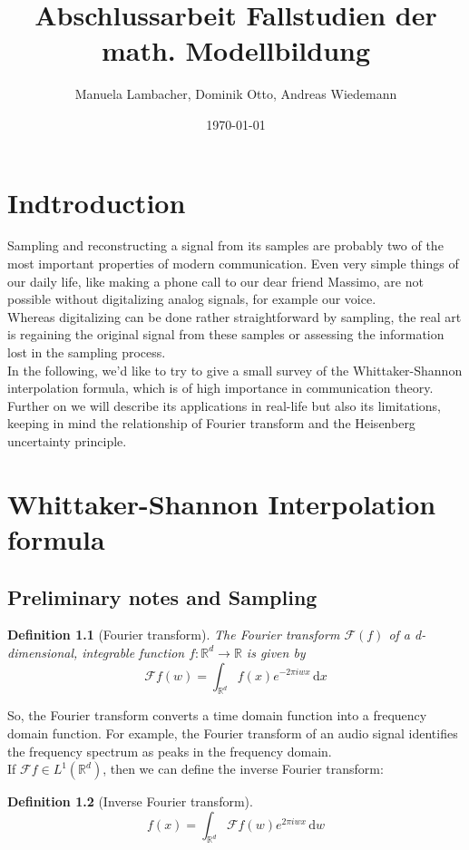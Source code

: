 \documentclass[a4paper, 11pt]{scrreprt}
\title{Abschlussarbeit Fallstudien der math. Modellbildung}
\author{Manuela Lambacher, Dominik Otto, Andreas Wiedemann}
\date{\today}
\newtheorem{defi}{Definition}[section]
\newcommand{\RR}{\mathbb{R}}
\newcommand{\FF}{\mathcal{F}}
\begin{document}
\parindent 0pt
\maketitle
\tableofcontents

\chapter*{Indtroduction}

Sampling and reconstructing a signal from its samples are probably two of the most important properties of modern communication.   Even very simple things of our daily life, like making a phone call to our dear friend Massimo, are not possible without digitalizing analog signals, for example  our voice. \\
Whereas digitalizing can be done rather  straightforward by sampling, the real art is regaining the original signal from these samples or assessing the information lost in the sampling process.\\
In the following, we'd like to try to give a small survey of the Whittaker-Shannon interpolation formula, which is of high importance in communication theory. Further on we will describe its applications in real-life but also its limitations, keeping in mind the relationship of Fourier transform and the Heisenberg uncertainty principle.



\chapter{Whittaker-Shannon Interpolation formula}


\section{Preliminary notes and Sampling}
\begin{defi}[Fourier transform]
The Fourier transform \(\FF(f)\) of a d-dimensional, integrable function \(f:\RR^d \to \RR\) is given by
	\begin{equation}
		\FF f(w)=\int_{\RR^d} f(x)e^{-2\pi iwx}\,\mathrm{d}x
	\end{equation}

\end{defi}
So, the Fourier transform converts a time domain function into a frequency domain function. For example, the Fourier transform of an audio signal identifies the frequency spectrum as peaks in the frequency domain.\\
If \(\FF f\in L^1(\RR^d)\), then we can define the inverse Fourier transform:
\begin{defi}[Inverse Fourier transform]
\begin{equation}
	f(x) = \int_{\RR^d} \FF f(w) e^{2\pi iwx}\,\mathrm{d}w
\end{equation}
\end{defi}
\end{document}
